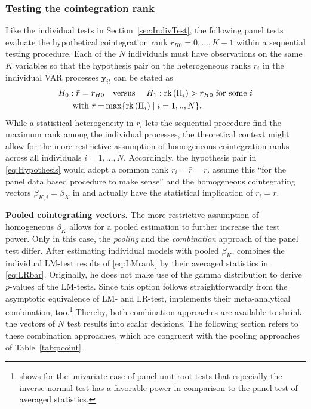 \subsubsection{Testing the cointegration rank}
Like the individual tests in Section~\ref{sec:IndivTest}, the following panel tests evaluate the hypothetical cointegration rank $ r_{H0}=0,...,K-1 $ within a sequential testing procedure. Each of the $ N $ individuals must have observations on the same $ K $ variables so that the hypothesis pair on the heterogeneous ranks $ r_i $ in the individual VAR processes $ \boldsymbol{y}_{it} $ can be stated as
\begin{align} \label{eq:Hypothesis}
\begin{split}
	H_0: \bar{r} = r_{H0} & \text{\quad versus \quad} H_1: \text{rk}\left( \Pi_i \right) > r_{H0} \ \text{for some} \ i \\
	\text{with} \ \bar{r} = & \max \{ \text{rk}\left( \Pi_i \right) \mid i=1,..,N \}.
\end{split}
\end{align}
While a statistical heterogeneity in $ r_i $ lets the sequential procedure find the maximum rank among the individual processes, the theoretical context might allow for the more restrictive assumption of homogeneous cointegration ranks across all individuals $ i=1,\ldots,N$. Accordingly, the hypothesis pair in \eqref{eq:Hypothesis} would adopt a common rank $ r_i = \bar{r} = r $. \citet[p.~9]{SilvestreSurdeanu2011} assume this ``for the panel data based procedure to make sense'' and the homogeneous cointegrating vectors $ \beta_{K,i} = \beta_K $ in \citet{Breitung2005} and \citet{GroenFrank2003} actually have the statistical implication of $ r_i = r $.


\textbf{Pooled cointegrating vectors.} The more restrictive assumption of homogeneous $ \beta_K $ allows for a pooled estimation to further increase the test power. Only in this case, the \textit{pooling} and the \textit{combination} approach of the panel test differ. After estimating individual models with pooled $ \beta_K $, \citet{Breitung2005} combines the individual LM-test results of \eqref{eq:LMrank} by their averaged statistics in \eqref{eq:LRbar}. Originally, he does not make use of the gamma distribution to derive $p$-values of the LM-tests. Since this option follows straightforwardly from the asymptotic equivalence of LM- and LR-test,  implements their meta-analytical combination, too.\footnote{\citet[p.~268]{Choi2001} shows for the univariate case of panel unit root tests that especially the inverse normal test has a favorable power in comparison to the panel test of averaged statistics.} Thereby, both combination approaches are available to shrink the vectors of $ N $ test results into scalar decisions. The following section refers to these combination approaches, which are congruent with the pooling approaches of Table~\ref{tab:pcoint}.


